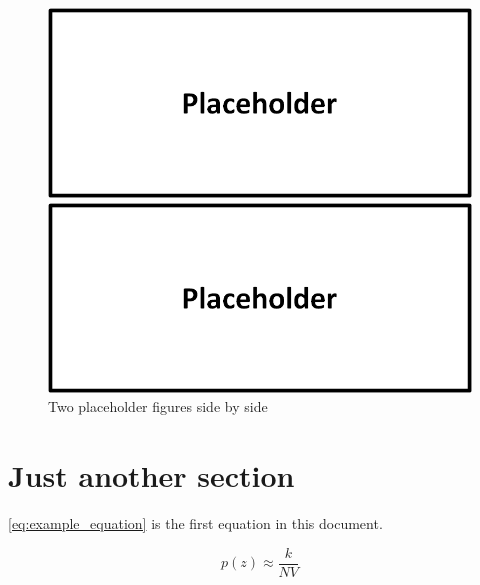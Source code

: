 \documentclass[]{aiaa-tc}%
\begin{document}
\begin{figure}[!htb]
\begin{minipage}[b]{0.5\linewidth}
\begin{center}
\includegraphics[width=\textwidth,height=\textheight,keepaspectratio]{placeholder.png}
\end{center}
\end{minipage}
\hspace{0.5cm}
\begin{minipage}[b]{0.5\linewidth}
\begin{center}
\includegraphics[width=\textwidth,height=\textheight,keepaspectratio]{placeholder.png}
\end{center}
\end{minipage}
\caption{Two placeholder figures side by side}
\label{fig:side_by_side_placeholders}
\end{figure}

\section{Just another section}

\autoref{eq:example_equation} is the first equation in this document.

\begin{equation} \label{eq:example_equation}
p(z)\approx \frac{k}{NV}
\end{equation}
\end{document}
